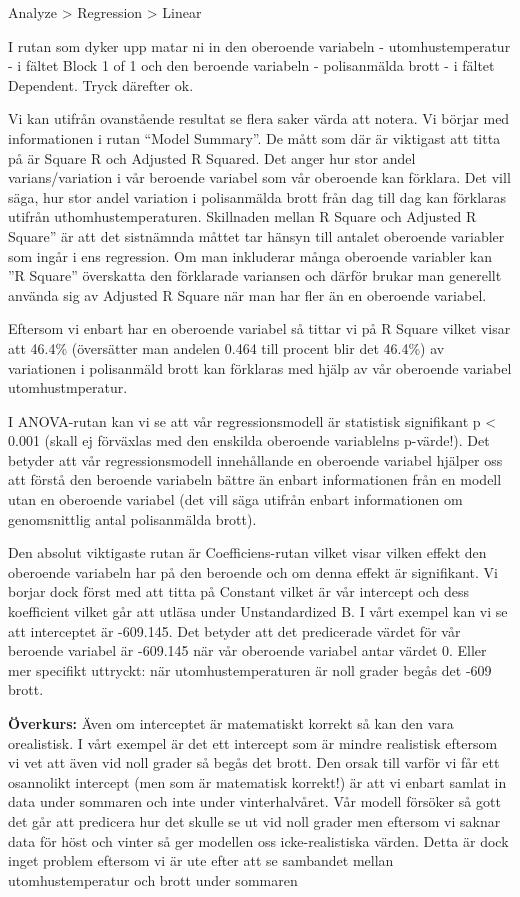 \documentclass[
]{book}
\begin{document}
Analyze \textgreater{} Regression \textgreater{} Linear

I rutan som dyker upp matar ni in den oberoende variabeln - utomhustemperatur - i fältet Block 1 of 1
och den beroende variabeln - polisanmälda brott - i fältet Dependent. Tryck därefter ok.

Vi kan utifrån ovanstående resultat se flera saker värda att notera. Vi börjar med informationen i rutan ``Model Summary''. De mått som där är viktigast att titta på är Square R och Adjusted R Squared. Det anger hur stor andel varians/variation i vår beroende variabel som vår oberoende kan förklara. Det vill säga, hur stor andel variation i polisanmälda brott från dag till dag kan förklaras utifrån uthomhustemperaturen. Skillnaden mellan R Square och Adjusted R Square'' är att det sistnämnda måttet tar hänsyn till antalet oberoende variabler som ingår i ens regression. Om man inkluderar många oberoende variabler kan ''R Square'' överskatta den förklarade variansen och därför brukar man generellt använda sig av Adjusted R Square när man har fler än en oberoende variabel.

Eftersom vi enbart har en oberoende variabel så tittar vi på R Square vilket visar att 46.4\% (översätter man andelen 0.464 till procent blir det 46.4\%) av variationen i polisanmäld brott kan förklaras med hjälp av vår oberoende variabel utomhustmperatur.

I ANOVA-rutan kan vi se att vår regressionsmodell är statistisk signifikant p \textless{} 0.001 (skall ej förväxlas med den enskilda oberoende variablelns p-värde!). Det betyder att vår regressionsmodell innehållande en oberoende variabel hjälper oss att förstå den beroende variabeln bättre än enbart informationen från en modell utan en oberoende variabel (det vill säga utifrån enbart informationen om genomsnittlig antal polisanmälda brott).

Den absolut viktigaste rutan är Coefficiens-rutan vilket visar vilken effekt den oberoende variabeln har på den beroende och om denna effekt är signifikant. Vi borjar dock först med att titta på Constant vilket är vår intercept och dess koefficient vilket går att utläsa under Unstandardized B. I vårt exempel kan vi se att interceptet är -609.145. Det betyder att det predicerade värdet för vår beroende variabel är -609.145 när vår oberoende variabel antar värdet 0. Eller mer specifikt uttryckt: när utomhustemperaturen är noll grader begås det -609 brott.

\textbf{Överkurs:}
Även om interceptet är matematiskt korrekt så kan den vara orealistisk. I vårt exempel är det ett intercept som är mindre realistisk eftersom vi vet att även vid noll grader så begås det brott. Den orsak till varför vi får ett osannolikt intercept (men som är matematisk korrekt!) är att vi enbart samlat in data under sommaren och inte under vinterhalvåret. Vår modell försöker så gott det går att predicera hur det skulle se ut vid noll grader men eftersom vi saknar data för höst och vinter så ger modellen oss icke-realistiska värden. Detta är dock inget problem eftersom vi är ute efter att se sambandet mellan utomhustemperatur och brott under sommaren
\end{document}
